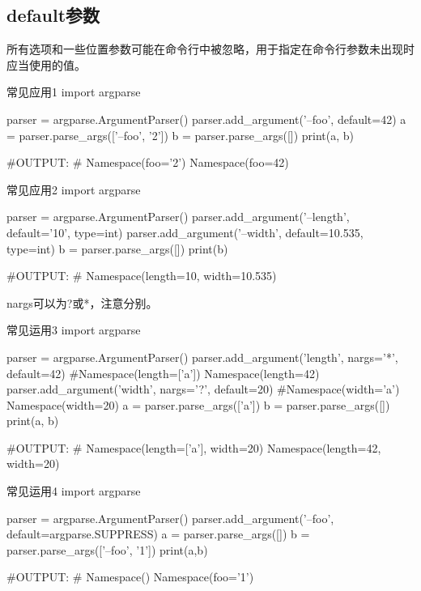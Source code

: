 \documentclass[11pt]{article}
\begin{document}
\subsection{default参数}
所有选项和一些位置参数可能在命令行中被忽略，用于指定在命令行参数未出现时应当使用的值。
\begin{Python}{常见应用1}
import argparse

parser = argparse.ArgumentParser()
parser.add_argument('--foo', default=42)
a = parser.parse_args(['--foo', '2'])
b = parser.parse_args([])
print(a, b)

#OUTPUT:
#       Namespace(foo='2') Namespace(foo=42)
\end{Python}
\begin{Python}{常见应用2}
import argparse

parser = argparse.ArgumentParser()
parser.add_argument('--length', default='10', type=int)
parser.add_argument('--width', default=10.535, type=int)
b = parser.parse_args([])
print(b)

#OUTPUT:
#       Namespace(length=10, width=10.535)
\end{Python}
nargs可以为?或*，注意分别。
\begin{Python}{常见运用3}
import argparse

parser = argparse.ArgumentParser()
parser.add_argument('length', nargs='*', default=42)     #Namespace(length=['a']) Namespace(length=42)  
parser.add_argument('width', nargs='?', default=20)     #Namespace(width='a') Namespace(width=20)
a = parser.parse_args(['a'])
b = parser.parse_args([])
print(a, b)

#OUTPUT:
#       Namespace(length=['a'], width=20) Namespace(length=42, width=20)
\end{Python}
\begin{Python}{常见运用4}
import argparse

parser = argparse.ArgumentParser()
parser.add_argument('--foo', default=argparse.SUPPRESS)
a = parser.parse_args([])
b = parser.parse_args(['--foo', '1'])
print(a,b)

#OUTPUT:
#       Namespace() Namespace(foo='1')
\end{Python}
\end{document}
